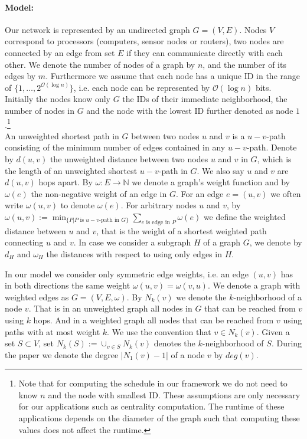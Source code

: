 \documentclass[11pt]{article}
\newcommand{\BO}{\mathcal{O}}
\begin{document}
\paragraph{Model:} Our network is represented by an undirected graph $G=\left(V,E\right)$. Nodes $V$ correspond to processors (computers, sensor nodes or routers),
two nodes are connected by an edge from set $E$ if they can communicate directly with each other. We denote the number of nodes of a graph by $n$, and the number of its edges by $m$. Furthermore we assume that each node has a unique ID in the range of $\{1,\dots,2^{\BO\left(\log n\right)}\}$, i.e. each node can be represented by $\BO(\log n)$ bits. 
Initially the nodes know only $G$ the IDs of their immediate neighborhood, the number of nodes in $G$ and the node with the lowest ID further denoted as node $1$.\footnote{Note that for computing the schedule in our framework we do not need to know $n$ and the node with smallest ID. These assumptions are only necessary for our applications such as centrality computation. The runtime of these applications depends on the diameter of the graph such that computing these values does not affect the runtime.} \\

An unweighted shortest path in $G$ between two nodes $u$ and $v$ is a $u-v$-path consisting of the minimum number of edges contained in any $u-v$-path. Denote by $d\left(u,v\right)$ the unweighted distance between two nodes $u$ and $v$ in $G$, which is the length of an unweighted shortest $u-v$-path in $G$. We also say $u$ and $v$ are $d(u,v)$ hops apart. By $\omega:E\rightarrow \mathbb{N}$ we denote a graph's weight function and by $\omega(e)$ the non-negative weight of an edge in $G$. For an edge $e=(u,v)$ we often write $\omega(u,v)$ to denote $\omega(e)$. For arbitrary nodes $u$ and $v$, by $\omega(u,v):=\min_{\{P|P\text{ is }u-v\text{-path in }G\}}\sum_{e\text{ is edge in }P}\omega(e)$ we define the weighted distance between $u$ and $v$, that is the weight of a shortest weighted path connecting $u$ and $v$. In case we consider a subgraph $H$ of a graph $G$, we denote by $d_H$ and $\omega_H$ the distances with respect to using only edges in $H$.

In our model we consider only symmetric edge weights, i.e. an edge $(u,v)$ has in both directions the same weight $\omega(u,v)=\omega(v,u)$. We denote a graph with weighted edges as $G=(V,E,\omega)$. By $N_k(v)$ we denote the $k$-neighborhood of a node $v$. That is in an unweighted graph all nodes in $G$ that can be reached from $v$ using $k$ hops. And in a weighted graph all nodes that can be reached from $v$ using paths with at most weight $k$.
We use the convention that $v\in N_{k}(v)$. Given a set $S\subset V$, set $N_k(S):=\cup_{v\in S}N_k(v)$ denotes the $k$-neighborhood of $S$. During the paper we denote the degree $|N_1(v)-1|$ of a node $v$ by $deg(v)$.
\end{document}
